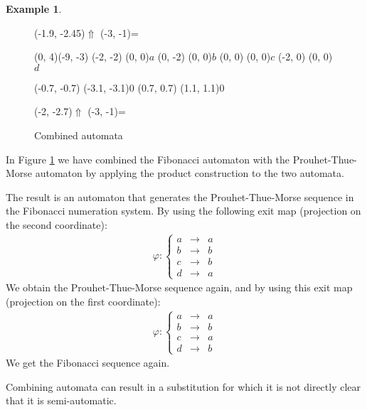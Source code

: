 \documentclass{article}
\theoremstyle{definition}
\newtheorem{example}[theorem]{Example}
\begin{document}
\begin{example}
\begin{figure}[H]
\begin{graph}
  \freetext(-1.9, -2.45){$\Uparrow$}
  \freetext(-3, -1){=}
\end{graph}
\begin{graph}(0, 4)(-9, -3)
  (-2, -2) (0, 0){$a$}
  (0, -2)  (0, 0){$b$}
  (0, 0) (0, 0){$c$}
  (-2, 0)  (0, 0){$d$}

  (-0.7, -0.7) \freetext(-3.1, -3.1){0}
   
   
  (0.7, 0.7) \freetext(1.1, 1.1){0}
   
   

  \freetext(-2, -2.7){$\Uparrow$}
  \freetext(-3, -1){=}
\end{graph}
\caption{Combined automata}
\label{fig:combined}
\end{figure}

In Figure \ref{fig:combined} we have combined the Fibonacci automaton with the 
Prouhet-Thue-Morse automaton by applying the product construction to the two 
automata.

The result is an automaton that generates the Prouhet-Thue-Morse sequence in 
the Fibonacci numeration system. By using the following exit map (projection
on the second coordinate):
\begin{eqnarray*}
\varphi: \left\{ \begin{array}{lll}
a &\rightarrow& a\\
b &\rightarrow& b\\
c &\rightarrow& b\\
d &\rightarrow& a
\end{array} \right.
\end{eqnarray*}
We obtain the Prouhet-Thue-Morse sequence again, and by using this exit map
(projection on the first coordinate):
\begin{eqnarray*}
\varphi: \left\{ \begin{array}{lll}
a &\rightarrow& a\\
b &\rightarrow& b\\
c &\rightarrow& a\\
d &\rightarrow& b
\end{array} \right.
\end{eqnarray*}
We get the Fibonacci sequence again.
\end{example}

Combining automata can result in a substitution for which it is not directly
clear that it is semi-automatic. 
\end{document}
